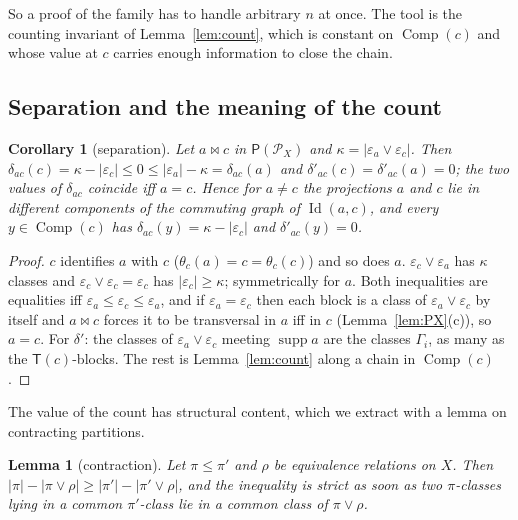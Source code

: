 \documentclass[11pt]{amsart}
\newtheorem{lemma}[theorem]{Lemma}
\newtheorem{corollary}[theorem]{Corollary}
\theoremstyle{definition}
\renewcommand{\P}{\mathcal{P}}      %
\newcommand{\PA}{\mathsf{P}}         %
\newcommand{\supp}{\operatorname{supp}}
\newcommand{\T}{\mathsf{T}}
\newcommand{\Id}{\operatorname{Id}}
\newcommand{\Comp}{\operatorname{Comp}}
\newcommand{\mt}{\bowtie}      %
\begin{document}
So a proof of the family has to handle arbitrary $n$ at once. The tool is the counting invariant of Lemma~\ref{lem:count}, which is constant on $\Comp(c)$ and whose value at $c$ carries enough information to close the chain.

\subsection{Separation and the meaning of the count}\label{subsec:value}

\begin{corollary}[separation]\label{cor:acomp}
Let $a\mt c$ in $\PA(\P_X)$ and $\kappa=|\varepsilon_a\vee\varepsilon_c|$. Then $\delta_{ac}(c)=\kappa-|\varepsilon_c|\le0\le|\varepsilon_a|-\kappa=\delta_{ac}(a)$ and $\delta'_{ac}(c)=\delta'_{ac}(a)=0$; the two values of $\delta_{ac}$ coincide iff $a=c$. Hence for $a\ne c$ the projections $a$ and $c$ lie in different components of the commuting graph of $\Id(a,c)$, and every $y\in\Comp(c)$ has $\delta_{ac}(y)=\kappa-|\varepsilon_c|$ and $\delta'_{ac}(y)=0$.
\end{corollary}

\begin{proof}
$c$ identifies $a$ with $c$ ($\theta_c(a)=c=\theta_c(c)$) and so does $a$. $\varepsilon_c\vee\varepsilon_a$ has $\kappa$ classes and $\varepsilon_c\vee\varepsilon_c=\varepsilon_c$ has $|\varepsilon_c|\ge\kappa$; symmetrically for $a$. Both inequalities are equalities iff $\varepsilon_a\le\varepsilon_c\le\varepsilon_a$, and if $\varepsilon_a=\varepsilon_c$ then each block is a class of $\varepsilon_a\vee\varepsilon_c$ by itself and $a\mt c$ forces it to be transversal in $a$ iff in $c$ (Lemma~\ref{lem:PX}(c)), so $a=c$. For $\delta'$: the classes of $\varepsilon_a\vee\varepsilon_c$ meeting $\supp a$ are the classes $\Gamma_i$, as many as the $\T(c)$-blocks. The rest is Lemma~\ref{lem:count} along a chain in $\Comp(c)$.
\end{proof}

The value of the count has structural content, which we extract with a lemma on contracting partitions.

\begin{lemma}[contraction]\label{lem:contr}
Let $\pi\le\pi'$ and $\rho$ be equivalence relations on $X$. Then $|\pi|-|\pi\vee\rho|\ge|\pi'|-|\pi'\vee\rho|$, and the inequality is strict as soon as two $\pi$-classes lying in a common $\pi'$-class lie in a common class of $\pi\vee\rho$.
\end{lemma}
\end{document}
